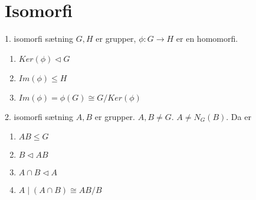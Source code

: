 \documentclass{article}
\begin{document}
\section*{Isomorfi}
1. isomorfi sætning
$G, H$ er grupper, $\phi : G \to H$ er en homomorfi.
\begin{enumerate}
  \item $Ker(\phi) \triangleleft G$
  \item $Im(\phi) \leq H$
  \item $Im(\phi) = \phi(G) \cong G / Ker(\phi)$
\end{enumerate}

2. isomorfi sætning
$A, B$ er grupper. $A, B \neq G$. $A \neq N_G(B)$. Da er
\begin{enumerate}
  \item $AB \leq G$
  \item $B \triangleleft AB$
  \item $A \cap B \triangleleft A$
  \item $A \mid (A \cap B) \cong AB/B$
\end{enumerate}
\end{document}
